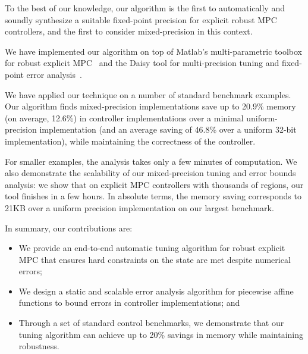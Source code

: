 To the best of our knowledge, our algorithm is the first to automatically and soundly
synthesize a suitable fixed-point precision for explicit robust MPC controllers,
and the first to consider mixed-precision in this context.

We have implemented our algorithm on top of Matlab's multi-parametric toolbox 
for robust explicit MPC~\cite{matlabMPT}
and the Daisy tool for multi-precision tuning and fixed-point error analysis~\cite{Daisy}.

We have applied our technique on a number of standard benchmark examples.
Our algorithm finds mixed-precision implementations  save up to 20.9\%
memory (on average, 12.6\%) in controller implementations over a minimal
uniform-precision implementation (and an average saving of 46.8\% over a uniform
32-bit implementation), while maintaining the correctness of the controller.

For smaller examples, the analysis takes only a few minutes of computation.
We also demonstrate the scalability of our mixed-precision tuning and error bounds analysis:
we show that on explicit MPC controllers with thousands of regions, our tool finishes in a few hours.
In absolute terms, the memory saving corresponds to 21KB over a uniform
precision implementation on our largest benchmark. 

In summary, our contributions are:
\begin{itemize}
\item We provide an end-to-end automatic tuning algorithm for robust explicit MPC that ensures
hard constraints on the state are met despite numerical errors;
\item We design a static and scalable error analysis algorithm for piecewise affine functions to bound
errors in controller implementations; and
\item Through a set of standard control benchmarks, we demonstrate that our tuning algorithm
can achieve up to 20\% savings in memory while maintaining robustness.
\end{itemize} 

